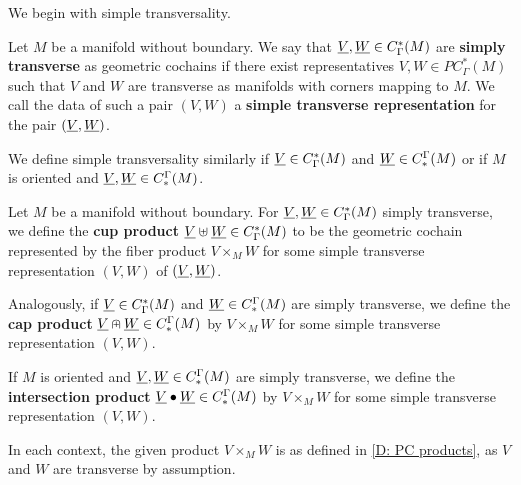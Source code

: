 We begin with simple transversality.

\begin{definition}\label{D: cochain trans}
	Let $M$ be a manifold without boundary.
	We say that $\underline{V}, \underline{W} \in C^*_{\Gamma}(M)$ are \textbf{simply transverse} as geometric cochains if there exist representatives $V,W \in PC^*_\Gamma(M)$ such that $V$ and $W$ are transverse as manifolds with corners mapping to $M$.
	We call the data of such a pair $(V,W)$ a \textbf{simple transverse representation} for the pair $(\underline{V},\underline{W})$.

	We define simple transversality similarly if $\underline{V} \in C^*_{\Gamma}(M)$ and $\underline{W} \in C_*^{\Gamma}(M)$ or if $M$ is oriented and $\underline{V}, \underline{W} \in C_*^{\Gamma}(M)$.
\end{definition}

\begin{definition}\label{D: cochain products}
	Let $M$ be a manifold without boundary.
	For $\underline{V}, \underline{W} \in C^*_{\Gamma}(M)$ simply transverse, we define the \textbf{cup product} $\underline{V} \uplus \underline{W} \in C^*_\Gamma(M)$ to be the geometric cochain represented by the fiber product $V \times_M W$ for some simple transverse representation $(V,W)$ of $(\underline{V},\underline{W})$.

	Analogously, if $\underline{V} \in C^*_{\Gamma}(M)$ and $\underline{W} \in C_*^{\Gamma}(M)$ are simply transverse, we define the \textbf{cap product} $\underline{V} \nplus \underline{W} \in C_*^\Gamma(M)$ by $V \times_M W$ for some simple transverse representation $(V,W)$.

	If $M$ is oriented and $\underline{V},\underline{W} \in C_*^\Gamma(M)$ are simply transverse, we define the \textbf{intersection product} $\underline{V} \bullet \underline{W} \in C_*^\Gamma(M)$ by $V \times_M W$ for some simple transverse representation $(V,W)$.

	In each context, the given product $V \times_M W$ is as defined in \cref{D: PC products}, as $V$ and $W$ are transverse by assumption.
\end{definition}

\begin{comment}
	It will follow from \cref{T: multicup}, below, that these products are well defined, independent of the choices of representing chains and cochains.
	This is not immediately clear, as a geometric (co)chain $\uV$ has in general an infinite number of representatives in $PC(M)$ that may or may not be transverse to any other given element of $PC(M)$; see \cref{E: bad transversality}.
	Rather than stop to prove well-definedness in the simple transversality case, we proceed toward our more general definition of transversality.
\end{comment}

